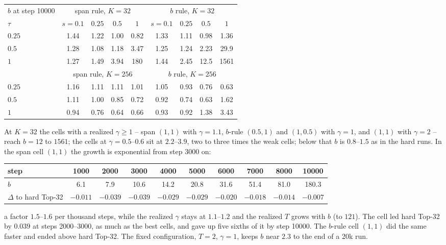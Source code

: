 \documentclass[11pt,a4paper]{article}
\begin{document}
\begin{center}\small
\begin{tabular}{l|cccc|cccc}
\toprule
$b$ at step 10000 & \multicolumn{4}{c|}{span rule, $K = 32$} & \multicolumn{4}{c}{$b$ rule, $K = 32$} \\
$\tau$ & $s{=}0.1$ & $0.25$ & $0.5$ & $1$ & $s{=}0.1$ & $0.25$ & $0.5$ & $1$ \\
\midrule
$0.25$ & 1.44 & 1.22 & 1.00 & 0.82 & 1.33 & 1.11 & 0.98 & 1.36 \\
$0.5$  & 1.28 & 1.08 & 1.18 & 3.47 & 1.25 & 1.24 & 2.23 & 29.9 \\
$1$    & 1.27 & 1.49 & 3.94 & 180 & 1.44 & 2.45 & 12.5 & 1561 \\
\midrule
& \multicolumn{4}{c|}{span rule, $K = 256$} & \multicolumn{4}{c}{$b$ rule, $K = 256$} \\
\midrule
$0.25$ & 1.16 & 1.11 & 1.11 & 1.01 & 1.05 & 0.93 & 0.76 & 0.63 \\
$0.5$  & 1.11 & 1.00 & 0.85 & 0.72 & 0.92 & 0.74 & 0.63 & 1.62 \\
$1$    & 0.94 & 0.76 & 0.64 & 0.66 & 0.93 & 0.92 & 1.38 & 3.43 \\
\bottomrule
\end{tabular}
\end{center}

At $K = 32$ the cells with a realized $\gamma \ge 1$ -- span $(1, 1)$ with
$\gamma = 1.1$, $b$-rule $(0.5, 1)$ and $(1, 0.5)$ with $\gamma = 1$, and
$(1, 1)$ with $\gamma = 2$ -- reach $b = 12$ to $1561$; the cells at $\gamma
= 0.5$--$0.6$ sit at $2.2$--$3.9$, two to three times the weak cells; below
that $b$ is $0.8$--$1.5$ as in the hard runs. In the span cell $(1, 1)$ the
growth is exponential from step 3000 on:

\begin{center}\footnotesize
\begin{tabular}{lccccccccc}
\toprule
step & 1000 & 2000 & 3000 & 4000 & 5000 & 6000 & 7000 & 8000 & 10000 \\
\midrule
$b$ & 6.1 & 7.9 & 10.6 & 14.2 & 20.8 & 31.6 & 51.4 & 81.0 & 180.3 \\
$\Delta$ to hard Top-32 & $-0.011$ & $-0.039$ & $-0.039$ & $-0.029$ & $-0.029$ & $-0.020$ & $-0.018$ & $-0.014$ & $-0.007$ \\
\bottomrule
\end{tabular}
\end{center}

a factor $1.5$--$1.6$ per thousand steps, while the realized $\gamma$ stays
at $1.1$--$1.2$ and the realized $T$ grows with $b$ (to $121$). The cell led
hard Top-32 by $0.039$ at steps 2000--3000, as much as the best cells, and
gave up five sixths of it by step 10000. The $b$-rule cell $(1, 1)$ did the
same faster and ended above hard Top-32. The fixed configuration, $T = 2$,
$\gamma = 1$, keeps $b$ near $2.3$ to the end of a 20k run.
\end{document}
